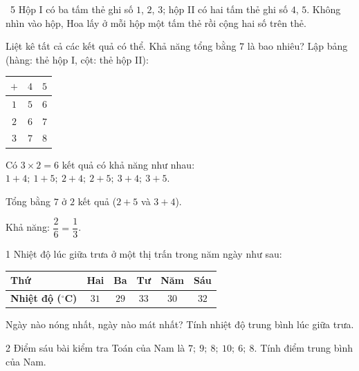 \begin{exbox}{\ExWord\ 5}
Hộp I có ba tấm thẻ ghi số $1$, $2$, $3$; hộp II có hai tấm thẻ ghi số $4$, $5$. Không nhìn vào hộp, Hoa lấy ở mỗi hộp một tấm thẻ rồi cộng hai số trên thẻ.\par
{} Liệt kê tất cả các kết quả có thể. \quad {} Khả năng tổng bằng $7$ là bao nhiêu?
\guide
{} Lập bảng (hàng: thẻ hộp I, cột: thẻ hộp II):
\begin{center}
\begin{tabular}{|c|c|c|}
\hline
$+$ & $4$ & $5$\\\hline
$1$ & $5$ & $6$\\\hline
$2$ & $6$ & $7$\\\hline
$3$ & $7$ & $8$\\\hline
\end{tabular}
\end{center}
Có $3\times2=6$ kết quả có khả năng như nhau: $1+4;\ 1+5;\ 2+4;\ 2+5;\ 3+4;\ 3+5$.\par
{} Tổng bằng $7$ ở $2$ kết quả ($2+5$ và $3+4$).\par Khả năng: $\dfrac26=\dfrac13$.
\end{exbox}
\needspace{5cm}
\begin{probbox}{1}{\relax}
Nhiệt độ lúc giữa trưa ở một thị trấn trong năm ngày như sau:
\begin{center}
\begin{tabular}{|l|c|c|c|c|c|}
\hline
\textbf{Thứ} & Hai & Ba & Tư & Năm & Sáu\\\hline
\textbf{Nhiệt độ ($^\circ$C)} & $31$ & $29$ & $33$ & $30$ & $32$\\\hline
\end{tabular}
\end{center}
 Ngày nào nóng nhất, ngày nào mát nhất? \quad {} Tính nhiệt độ trung bình lúc giữa trưa.
\end{probbox}
\gap
\begin{probbox}{2}{\relax}
Điểm sáu bài kiểm tra Toán của Nam là $7;\ 9;\ 8;\ 10;\ 6;\ 8$. Tính điểm trung bình của Nam.
\end{probbox}
